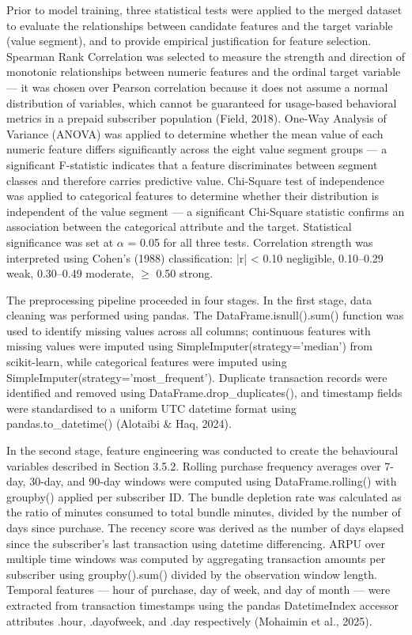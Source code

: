 Prior to model training, three statistical tests were applied to the merged dataset to evaluate the relationships between candidate features and the target variable (value segment), and to provide empirical justification for feature selection. Spearman Rank Correlation was selected to measure the strength and direction of monotonic relationships between numeric features and the ordinal target variable --- it was chosen over Pearson correlation because it does not assume a normal distribution of variables, which cannot be guaranteed for usage-based behavioral metrics in a prepaid subscriber population (Field, 2018). One-Way Analysis of Variance (ANOVA) was applied to determine whether the mean value of each numeric feature differs significantly across the eight value segment groups --- a significant F-statistic indicates that a feature discriminates between segment classes and therefore carries predictive value. Chi-Square test of independence was applied to categorical features to determine whether their distribution is independent of the value segment --- a significant Chi-Square statistic confirms an association between the categorical attribute and the target. Statistical significance was set at $\alpha$ = 0.05 for all three tests. Correlation strength was interpreted using Cohen's (1988) classification: |r| < 0.10 negligible, 0.10--0.29 weak, 0.30--0.49 moderate, $\geq$ 0.50 strong.

The preprocessing pipeline proceeded in four stages. In the first stage, data cleaning was performed using pandas. The DataFrame.isnull().sum() function was used to identify missing values across all columns; continuous features with missing values were imputed using SimpleImputer(strategy='median') from scikit-learn, while categorical features were imputed using SimpleImputer(strategy='most\_frequent'). Duplicate transaction records were identified and removed using DataFrame.drop\_duplicates(), and timestamp fields were standardised to a uniform UTC datetime format using pandas.to\_datetime() (Alotaibi \& Haq, 2024).

In the second stage, feature engineering was conducted to create the behavioural variables described in Section 3.5.2. Rolling purchase frequency averages over 7-day, 30-day, and 90-day windows were computed using DataFrame.rolling() with groupby() applied per subscriber ID. The bundle depletion rate was calculated as the ratio of minutes consumed to total bundle minutes, divided by the number of days since purchase. The recency score was derived as the number of days elapsed since the subscriber's last transaction using datetime differencing. ARPU over multiple time windows was computed by aggregating transaction amounts per subscriber using groupby().sum() divided by the observation window length. Temporal features --- hour of purchase, day of week, and day of month --- were extracted from transaction timestamps using the pandas DatetimeIndex accessor attributes .hour, .dayofweek, and .day respectively (Mohaimin et al., 2025).

